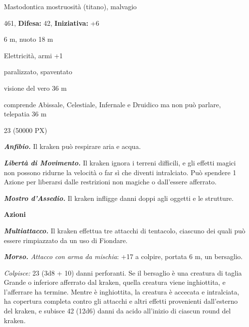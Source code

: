 \begin{multicols}{2}
{
\noindent
\begin{description}[noitemsep, topsep=0pt, parsep=0pt, partopsep=0pt, leftmargin=0cm, labelwidth=2.2cm]
	\item[\textbf{Taglia/Tipo:}] Mastodontica mostruosità (titano), malvagio
	\item[\textbf{Caratt.:}] 
	\item[\textbf{Punti Ferita:}] 461,  \textbf{Difesa:} 42,  \textbf{Iniziativa:} +6
	\item[\textbf{Movimento:}] 6 m, nuoto 18 m
	\item[\textbf{Tiri Salvez.:}] 
	\item[\textbf{Imm. Danni:}] Elettricità, armi +1
	\item[\textbf{Immunità:}] paralizzato, spaventato
	\item[\textbf{Sensi:}] visione del vero 36 m
	\item[\textbf{Linguaggi:}] comprende Abissale, Celestiale, Infernale e Druidico ma non può parlare, telepatia 36 m
	\item[\textbf{Sfida:}] 23 (50000 PX)\smallskip
\end{description}

\emph{\textbf{Anfibio.}} Il kraken può respirare aria e acqua.

\emph{\textbf{Libertà di Movimento.}} Il kraken ignora i terreni difficili, e gli effetti magici non possono ridurne la velocità o far sì che diventi intralciato. Può spendere 1 Azione per liberarsi dalle restrizioni non magiche o dall'essere afferrato.

\emph{\textbf{Mostro d'Assedio.}} Il kraken infligge danni doppi agli oggetti e le strutture.

\textbf{Azioni}

\emph{\textbf{Multiattacco.}} Il kraken effettua tre attacchi di tentacolo, ciascuno dei quali può essere rimpiazzato da un uso di Fiondare.

\emph{\textbf{Morso.} Attacco con arma da mischia}: +17 a colpire, portata 6 m, un bersaglio.

\emph{Colpisce:} 23 (3d8 + 10) danni perforanti. Se il bersaglio è una creatura di taglia Grande o inferiore afferrato dal kraken, quella creatura viene inghiottita, e l'afferrare ha termine. Mentre è inghiottita, la creatura è accecata e intralciata, ha copertura completa contro gli attacchi e altri effetti provenienti dall'esterno del kraken, e subisce 42 (12d6) danni da acido all'inizio di ciascun round del kraken.

}
\end{multicols}

